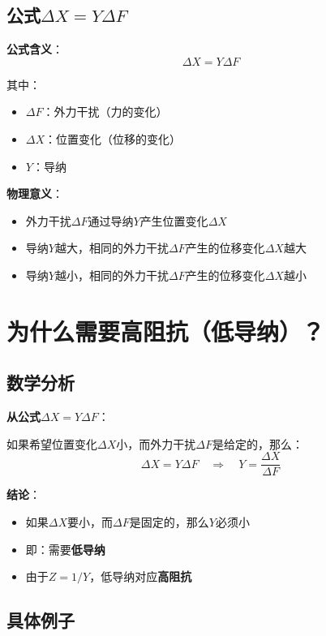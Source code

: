 \documentclass[12pt,a4paper]{article}
\begin{document}
\subsection{公式$\Delta X = Y \Delta F$}

\textbf{公式含义}：
\begin{equation}
\Delta X = Y \Delta F
\end{equation}

其中：
\begin{itemize}
\item $\Delta F$：外力干扰（力的变化）
\item $\Delta X$：位置变化（位移的变化）
\item $Y$：导纳
\end{itemize}

\textbf{物理意义}：
\begin{itemize}
\item 外力干扰$\Delta F$通过导纳$Y$产生位置变化$\Delta X$
\item 导纳$Y$越大，相同的外力干扰$\Delta F$产生的位移变化$\Delta X$越大
\item 导纳$Y$越小，相同的外力干扰$\Delta F$产生的位移变化$\Delta X$越小
\end{itemize}

\section{为什么需要高阻抗（低导纳）？}

\subsection{数学分析}

\textbf{从公式$\Delta X = Y \Delta F$}：

如果希望位置变化$\Delta X$小，而外力干扰$\Delta F$是给定的，那么：
\begin{equation}
\Delta X = Y \Delta F \quad \Rightarrow \quad Y = \frac{\Delta X}{\Delta F}
\end{equation}

\textbf{结论}：
\begin{itemize}
\item 如果$\Delta X$要小，而$\Delta F$是固定的，那么$Y$必须小
\item 即：需要\textbf{低导纳}
\item 由于$Z = 1/Y$，低导纳对应\textbf{高阻抗}
\end{itemize}

\subsection{具体例子}
\end{document}
